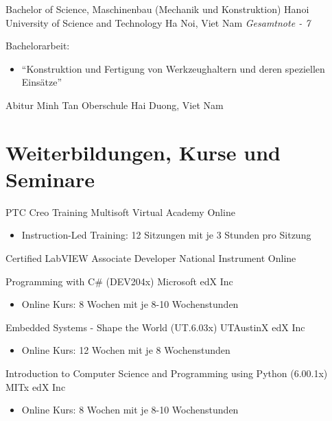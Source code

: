 \documentclass[11pt,a4paper,sans]{moderncv}
\begin{document}
{Bachelor of Science, Maschinenbau (Mechanik und Konstruktion)}
{Hanoi University of Science and Technology}
{Ha Noi, Viet Nam}
{\textit{Gesamtnote - 7}}
{
    Bachelorarbeit:
    \begin{itemize}
        \item "`Konstruktion und Fertigung von Werkzeughaltern und deren speziellen Einsätze"'
    \end{itemize}
}

{Abitur}
{Minh Tan Oberschule}
{Hai Duong, Viet Nam}
{}
{}

\section{\textbf{Weiterbildungen, Kurse und Seminare}}

{PTC Creo Training}
{Multisoft Virtual Academy}
{Online}
{}
{
    \begin{itemize}
        \item Instruction-Led Training: 12 Sitzungen mit je 3 Stunden pro Sitzung
    \end{itemize}
}

{Certified LabVIEW Associate Developer}
{National Instrument}
{Online}
{}
{
}

{Programming with C\# (DEV204x)}
{Microsoft}
{edX Inc}
{}
{
    \begin{itemize}
        \item Online Kurs: 8 Wochen mit je 8-10 Wochenstunden
    \end{itemize}
}

{Embedded Systems - Shape the World (UT.6.03x)}
{UTAustinX}
{edX Inc}
{}
{
    \begin{itemize}
        \item Online Kurs: 12 Wochen mit je 8 Wochenstunden
    \end{itemize}
}

{Introduction to Computer Science and Programming using Python (6.00.1x)}
{MITx}
{edX Inc}
{}
{
    \begin{itemize}
        \item Online Kurs: 8 Wochen mit je 8-10 Wochenstunden
    \end{itemize}
}
\end{document}
